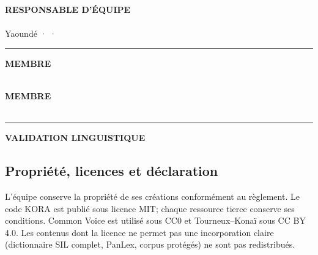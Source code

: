 \begin{tcolorbox}[
  enhanced,colback=Paper,colframe=Line,arc=3mm,boxrule=0.7pt,
  left=5mm,right=5mm,top=4mm,bottom=4mm
]
{\color{TealDark}\small\bfseries RESPONSABLE D’ÉQUIPE}\\[1mm]
{\color{Ink}\large\bfseries \TeamLead}\\[1mm]
{\color{Slate}\small Yaoundé · \href{mailto:\TeamLeadEmail}{\TeamLeadEmail} · \TeamLeadPhone}

\vspace{2mm}
{\color{Line}\rule{\linewidth}{0.6pt}}
\vspace{1mm}

\begin{minipage}[t]{0.48\linewidth}
  {\color{TealDark}\small\bfseries MEMBRE}\\[1mm]
  {\color{Ink}\bfseries \MemberTwo}\\[1mm]
  {\color{Slate}\small\href{mailto:\MemberTwoEmail}{\MemberTwoEmail}}
\end{minipage}\hfill
\begin{minipage}[t]{0.48\linewidth}
  {\color{TealDark}\small\bfseries MEMBRE}\\[1mm]
  {\color{Ink}\bfseries \MemberThree}\\[1mm]
  {\color{Slate}\small\href{mailto:\MemberThreeEmail}{\MemberThreeEmail}}
\end{minipage}

\vspace{3mm}
{\color{Line}\rule{\linewidth}{0.6pt}}
\vspace{1mm}
{\color{TealDark}\small\bfseries VALIDATION LINGUISTIQUE}\\[1mm]
{\color{Ink}\bfseries \LinguisticValidator}
\end{tcolorbox}

\subsection{Propriété, licences et déclaration}

\begin{evidencebox}
L’équipe conserve la propriété de ses créations conformément au règlement.
Le code KORA est publié sous licence MIT; chaque ressource tierce conserve ses
conditions. Common Voice est utilisé sous CC0 et Tourneux--Konaï sous CC BY
4.0. Les contenus dont la licence ne permet pas une incorporation claire
(dictionnaire SIL complet, PanLex, corpus protégés) ne sont pas redistribués.
\end{evidencebox}

